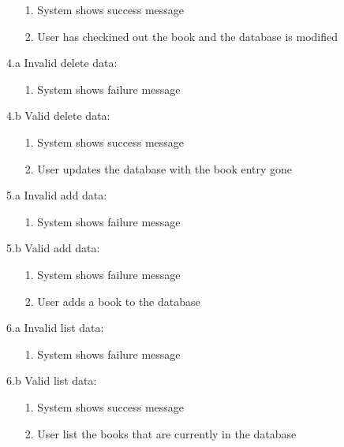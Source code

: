 \documentclass[a4paper, 10pt, oneside, draft]{article}
\begin{document}
\begin{usecase}
{\begin{enumerate}
		\item[1.] System shows success message
		\item[2.] User has checkined out the book and the database is modified
		\end{enumerate}
	\item[4.a] Invalid delete data:
		\begin{enumerate}
		\item[1.] System shows failure message
		\end{enumerate}
	\item[4.b] Valid delete data:
		\begin{enumerate}
		\item[1.] System shows success message
		\item[2.] User updates the database with the book entry gone
		\end{enumerate}
	\item[5.a] Invalid add data:
		\begin{enumerate}
		\item[1.] System shows failure message
		\end{enumerate}
	\item[5.b] Valid add data:
		\begin{enumerate}
		\item[1.] System shows failure message
		\item[2.] User adds a book to the database
		\end{enumerate}
	\item[6.a] Invalid list data:
		\begin{enumerate}
		\item[1.] System shows failure message
		\end{enumerate}
	\item[6.b] Valid list data:
		\begin{enumerate}
		\item[1.] System shows success message
		\item[2.] User list the books that are currently in the database
		\end{enumerate}
}





\end{usecase}
\end{document}
